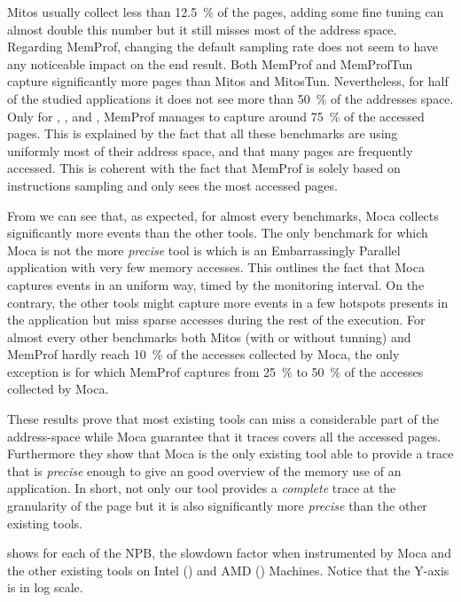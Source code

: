 \gls{Mitos} usually collect less than \SI{12.5}{\%} of the pages, adding some fine tuning can almost double this number but it still misses most of the address space.
Regarding \gls{MemProf}, changing the default sampling rate does not seem to have any noticeable impact on the end result.
Both \gls{MemProf} and MemProfTun capture significantly more pages than \gls{Mitos} and MitosTun.
Nevertheless, for half of the studied applications it does not see more than \SI{50}{\%} of the addresses space.
Only for \BT, \LU, \SP and \UA, \gls{MemProf} manages to capture around \SI{75}{\%} of the accessed pages.
This is explained by the fact that all these benchmarks are using uniformly most of their address space, and that many pages are frequently accessed.
This is coherent with the fact that \gls{MemProf} is solely based on instructions sampling and only sees the most accessed pages.

From  we can see that, as expected, for almost every benchmarks, \gls{Moca} collects significantly more events than the other tools.
 The only benchmark for which \gls{Moca} is not the more \emph{precise} tool is \EP which is an Embarrassingly Parallel application with very few memory accesses.
This outlines the fact that \gls{Moca} captures events in an uniform way, timed by the monitoring interval.
On the contrary, the other tools might capture more events in a few hotspots presents in the application but miss sparse accesses during the rest of the execution.
For almost every other benchmarks both \gls{Mitos} (with or without tunning) and \gls{MemProf} hardly reach \SI{10}{\%} of the accesses collected by \gls{Moca}, the only exception is \DC for which \gls{MemProf} captures from \SI{25}{\%} to \SI{50}{\%} of the accesses collected by \gls{Moca}.

These results prove that most existing tools can miss a considerable part of
the address-space while \gls{Moca} guarantee that it traces covers all the accessed pages.
Furthermore they show that \gls{Moca} is the only existing tool able to provide a trace that is \emph{precise} enough to give an good overview of the memory use of an application.
In short, not only our tool provides a \emph{complete} trace at the granularity of the page but it is also significantly more \emph{precise} than the other existing tools.

 shows for each of the \gls{NPB}, the slowdown factor when instrumented by \gls{Moca} and the other existing tools on Intel () and AMD () Machines.
Notice that the Y-axis is in log scale.


